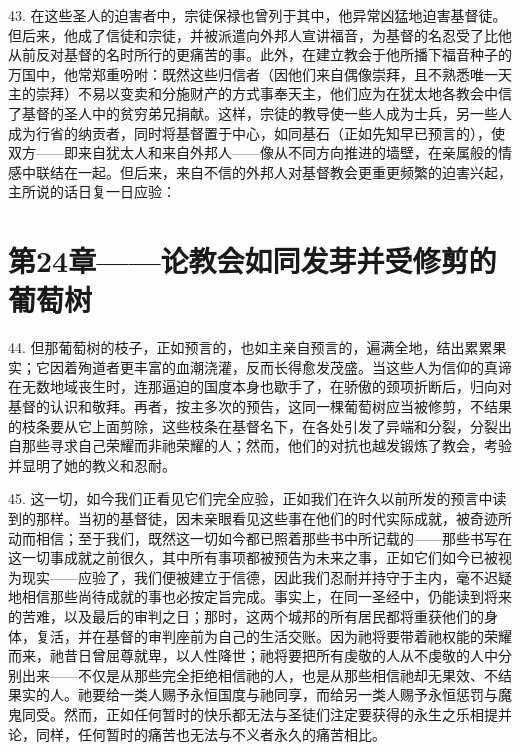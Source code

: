 43. 在这些圣人的迫害者中，宗徒保禄也曾列于其中，他异常凶猛地迫害基督徒。但后来，他成了信徒和宗徒，并被派遣向外邦人宣讲福音，为基督的名忍受了比他从前反对基督的名时所行的更痛苦的事。此外，在建立教会于他所播下福音种子的万国中，他常郑重吩咐：既然这些归信者（因他们来自偶像崇拜，且不熟悉唯一天主的崇拜）不易以变卖和分施财产的方式事奉天主，他们应为在犹太地各教会中信了基督的圣人中的贫穷弟兄捐献。这样，宗徒的教导使一些人成为士兵，另一些人成为行省的纳贡者，同时将基督置于中心，如同基石（正如先知早已预言的），使双方——即来自犹太人和来自外邦人——像从不同方向推进的墙壁，在亲属般的情感中联结在一起。但后来，来自不信的外邦人对基督教会更重更频繁的迫害兴起，主所说的话日复一日应验：\par


\section{第24章——论教会如同发芽并受修剪的葡萄树}

44. 但那葡萄树的枝子，正如预言的，也如主亲自预言的，遍满全地，结出累累果实；它因着殉道者更丰富的血潮浇灌，反而长得愈发茂盛。当这些人为信仰的真谛在无数地域丧生时，连那逼迫的国度本身也歇手了，在骄傲的颈项折断后，归向对基督的认识和敬拜。再者，按主多次的预告，这同一棵葡萄树应当被修剪，不结果的枝条要从它上面剪除，这些枝条在基督名下，在各处引发了异端和分裂，分裂出自那些寻求自己荣耀而非祂荣耀的人；然而，他们的对抗也越发锻炼了教会，考验并显明了她的教义和忍耐。\par

45. 这一切，如今我们正看见它们完全应验，正如我们在许久以前所发的预言中读到的那样。当初的基督徒，因未亲眼看见这些事在他们的时代实际成就，被奇迹所动而相信；至于我们，既然这一切如今都已照着那些书中所记载的——那些书写在这一切事成就之前很久，其中所有事项都被预告为未来之事，正如它们如今已被视为现实——应验了，我们便被建立于信德，因此我们忍耐并持守于主内，毫不迟疑地相信那些尚待成就的事也必按定旨完成。事实上，在同一圣经中，仍能读到将来的苦难，以及最后的审判之日；那时，这两个城邦的所有居民都将重获他们的身体，复活，并在基督的审判座前为自己的生活交账。因为祂将要带着祂权能的荣耀而来，祂昔日曾屈尊就卑，以人性降世；祂将要把所有虔敬的人从不虔敬的人中分别出来——不仅是从那些完全拒绝相信祂的人，也是从那些相信祂却无果效、不结果实的人。祂要给一类人赐予永恒国度与祂同享，而给另一类人赐予永恒惩罚与魔鬼同受。然而，正如任何暂时的快乐都无法与圣徒们注定要获得的永生之乐相提并论，同样，任何暂时的痛苦也无法与不义者永久的痛苦相比。\par

